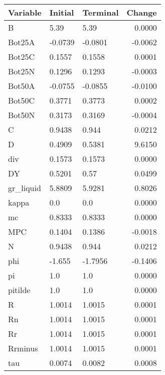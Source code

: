\begin{table}
\centering
\label{tab:stst_comparison_end_L_limit_permanent_asymmetric}
\begin{tabular}{lllr}
\toprule
                Variable & Initial & Terminal &  Change \\
\midrule
                       B &    5.39 &     5.39 &  0.0000 \\
                  Bot25A & -0.0739 &  -0.0801 & -0.0062 \\
                  Bot25C &  0.1557 &   0.1558 &  0.0001 \\
                  Bot25N &  0.1296 &   0.1293 & -0.0003 \\
                  Bot50A & -0.0755 &  -0.0855 & -0.0100 \\
                  Bot50C &  0.3771 &   0.3773 &  0.0002 \\
                  Bot50N &  0.3173 &   0.3169 & -0.0004 \\
                       C &  0.9438 &    0.944 &  0.0212 \\
                       D &  0.4909 &   0.5381 &  9.6150 \\
                     div &  0.1573 &   0.1573 &  0.0000 \\
                      DY &  0.5201 &     0.57 &  0.0499 \\
               gr\_liquid &  5.8809 &   5.9281 &  0.8026 \\
                   kappa &     0.0 &      0.0 &  0.0000 \\
                      mc &  0.8333 &   0.8333 &  0.0000 \\
                     MPC &  0.1404 &   0.1386 & -0.0018 \\
                       N &  0.9438 &    0.944 &  0.0212 \\
                     phi &  -1.655 &  -1.7956 & -0.1406 \\
                      pi &     1.0 &      1.0 &  0.0000 \\
                 pitilde &     1.0 &      1.0 &  0.0000 \\
                       R &  1.0014 &   1.0015 &  0.0001 \\
                      Rn &  1.0014 &   1.0015 &  0.0001 \\
                      Rr &  1.0014 &   1.0015 &  0.0001 \\
                 Rrminus &  1.0014 &   1.0015 &  0.0001 \\
                     tau &  0.0074 &   0.0082 &  0.0008 \\

\end{tabular}
\end{table}
